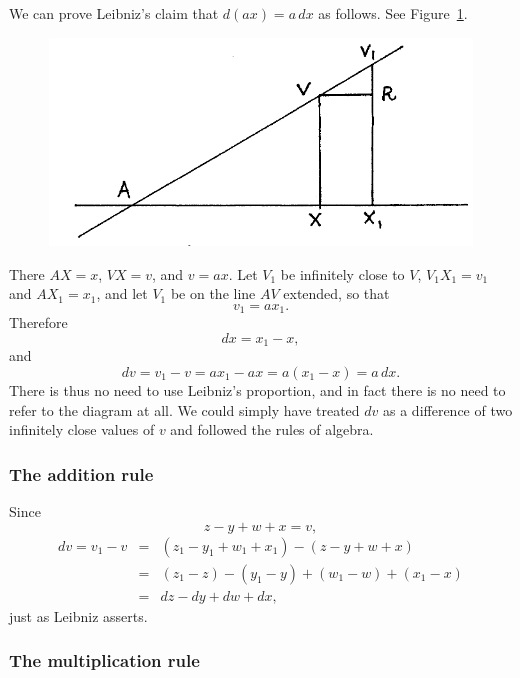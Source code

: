 \documentclass[twoside,openright]{article}
\begin{document}
We can prove Leibniz's claim that $d(ax) = a\,dx$ as follows.  See Figure~\ref{concoeff}. 
\begin{figure}[htp]
\begin{center}
\includegraphics[width=.75\textwidth]{fig/Figure13}
\caption{}
\label{concoeff}
\vspace{-10pt}
\end{center}
\end{figure} There $AX=x$, $VX =v$, and $v =ax$. Let $V_1$ be
infinitely close to $V$, $V_1X_1 =v_1$ and $AX_1 =x_1$, and let $V_1$
be on the line $AV$ extended, so that
$$v_1=ax_1.$$
Therefore 
$$dx = x_1 -x,$$
and
$$dv = v_1 - v =  ax_1 -ax = a(x_1 - x) = a\,dx.$$
There is thus no need to use Leibniz's proportion, and in fact there
is no need to refer to the diagram at all.  We could simply have
treated $dv$ as a difference of two infinitely close values of $v$ and
followed the rules of algebra.

\subsubsection*{The addition rule}

Since 
$$z-y+w+x = v,$$
\begin{eqnarray*}
dv = v_1 - v &  =  & (z_1 - y_1 + w_1 + x_1) - (z - y + w + x) \\
 & = & (z_1 - z) - (y_1 - y) + (w_1 -w) + (x_1 -x) \\
 & = & dz - dy + dw + dx,
 \end{eqnarray*}
 just as Leibniz asserts.
 
 \subsubsection*{The multiplication rule}
 
\end{document}
